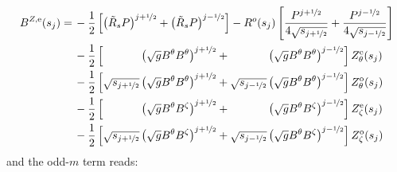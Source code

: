 \begin{align}
  B^{Z,\mathrm{e}} (s_j)
  =&\, - \frac{1}{2} \left[ \left( \tilde{R}_s P \right)^{j+\half} + \left( \tilde{R}_s P \right)^{j-\half} \right]
       - R^o(s_j) \left[ \frac{P^{j+\half}}{4 \sqrt{s_{j+\half}}}  + \frac{P^{j-\half}}{4 \sqrt{s_{j-\half}}}  \right] \nonumber \\
  ~&\, - \frac{1}{2} \left[   \phantom{\sqrt{s_{j+\half}}} \left( \sqrt{g} B^\theta B^\theta \right)^{j+\half}
                            + \phantom{\sqrt{s_{j-\half}}} \left( \sqrt{g} B^\theta B^\theta \right)^{j-\half} \right] Z_\theta^\mathrm{e}(s_j) \nonumber \\
  ~&\, - \frac{1}{2} \left[            \sqrt{s_{j+\half}}  \left( \sqrt{g} B^\theta B^\theta \right)^{j+\half}
                            +          \sqrt{s_{j-\half}}  \left( \sqrt{g} B^\theta B^\theta \right)^{j-\half} \right] Z_\theta^\mathrm{o}(s_j) \nonumber \\
  ~&\, - \frac{1}{2} \left[   \phantom{\sqrt{s_{j+\half}}} \left( \sqrt{g} B^\theta  B^\zeta \right)^{j+\half}
                            + \phantom{\sqrt{s_{j-\half}}} \left( \sqrt{g} B^\theta  B^\zeta \right)^{j-\half} \right]  Z_\zeta^\mathrm{e}(s_j) \nonumber \\
  ~&\, - \frac{1}{2} \left[            \sqrt{s_{j+\half}}  \left( \sqrt{g} B^\theta  B^\zeta \right)^{j+\half}
                            +          \sqrt{s_{j-\half}}  \left( \sqrt{g} B^\theta  B^\zeta \right)^{j-\half} \right]  Z_\zeta^\mathrm{o}(s_j) \label{eqn:bzmn_e}
\end{align}
and the odd-$m$ term reads:
